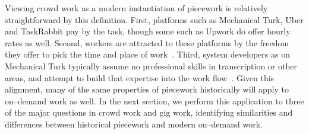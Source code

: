 \documentclass[trackingWork]{subfiles}
\begin{document}
Viewing crowd work as a modern instantiation of piecework is relatively straightforward by this definition.
First, platforms such as Mechanical Turk, Uber and TaskRabbit pay by the task, though some such as Upwork do offer hourly rates as well.
Second, workers are attracted to these platforms by the freedom they offer to pick the time and place of work~\cite{martin2014being,whyWouldAnyoneBrewer}.
Third, system developers as on Mechanical Turk typically assume no professional skills in transcription or other areas, and attempt to build that expertise into the work flow~\cite{noronha2011platemate,bernsteinSoylent}.
Given this alignment, many of the same properties of piecework historically will apply to on--demand work as well. 
In the next section, we perform this application to three of the major questions in crowd work and gig work, identifying similarities and differences between historical piecework and modern on--demand work.



\end{document}
